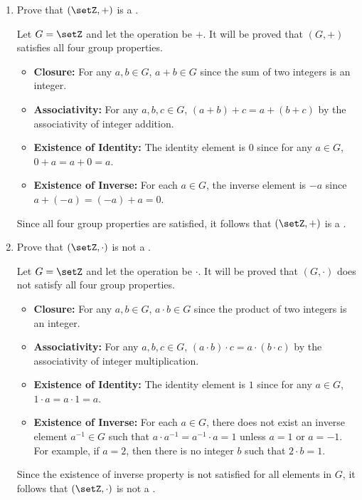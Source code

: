 \begin{enumerate}
  \item Prove that \((\setZ, +)\) is a .
  \begin{subprove}
    Let \(G = \setZ\) and let the operation be \(+\).
    It will be proved that \((G, +)\) satisfies all four group properties.
    \begin{itemize}
      \item \textbf{Closure:} For any \(a, b \in G\), \(a + b \in G\) since the sum of two integers is an integer.
      \item \textbf{Associativity:} For any \(a, b, c \in G\), \((a + b) + c = a + (b + c)\) by the associativity of integer addition.
      \item \textbf{Existence of Identity:} The identity element is \(0\) since for any \(a \in G\), \(0 + a = a + 0 = a\).
      \item \textbf{Existence of Inverse:} For each \(a \in G\), the inverse element is \(-a\) since \(a + (-a) = (-a) + a = 0\).
    \end{itemize}
    Since all four group properties are satisfied, it follows that \((\setZ, +)\) is a .
  \end{subprove}
  \item Prove that \((\setZ, \cdot)\) is not a .
  \begin{subprove}
    Let \(G = \setZ\) and let the operation be \(\cdot\).
    It will be proved that \((G, \cdot)\) does not satisfy all four group properties.
    \begin{itemize}
      \item \textbf{Closure:} For any \(a, b \in G\), \(a \cdot b \in G\) since the product of two integers is an integer.
      \item \textbf{Associativity:} For any \(a, b, c \in G\), \((a \cdot b) \cdot c = a \cdot (b \cdot c)\) by the associativity of integer multiplication.
      \item \textbf{Existence of Identity:} The identity element is \(1\) since for any \(a \in G\), \(1 \cdot a = a \cdot 1 = a\).
      \item \textbf{Existence of Inverse:} For each \(a \in G\), there does not exist an inverse element \(a^{-1} \in G\) such that \(a \cdot a^{-1} = a^{-1} \cdot a = 1\) unless \(a = 1\) or \(a = -1\). For example, if \(a = 2\), then there is no integer \(b\) such that \(2 \cdot b = 1\).
    \end{itemize}
    Since the existence of inverse property is not satisfied for all elements in \(G\), it follows that \((\setZ, \cdot)\) is not a .

\end{subprove}
\end{enumerate}
